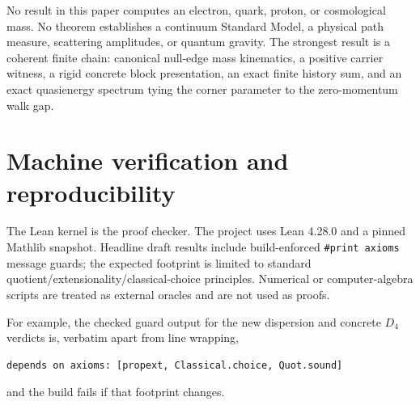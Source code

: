 \documentclass[11pt]{article}
\begin{document}
No result in this paper computes an electron, quark, proton, or cosmological
mass.  No theorem establishes a continuum Standard Model, a physical path
measure, scattering amplitudes, or quantum gravity.  The strongest result is a
coherent finite chain: canonical null-edge mass kinematics, a positive carrier
witness, a rigid concrete block presentation, an exact finite history sum, and
an exact quasienergy spectrum tying the corner parameter to the zero-momentum
walk gap.

\section{Machine verification and reproducibility}

The Lean kernel is the proof checker.  The project uses Lean 4.28.0 and a pinned
Mathlib snapshot.  Headline draft results include build-enforced
\texttt{\#print axioms} message guards; the expected footprint is limited to
standard quotient/extensionality/classical-choice principles.  Numerical or
computer-algebra scripts are treated as external oracles and are not used as
proofs.

For example, the checked guard output for the new dispersion and concrete
$D_4$ verdicts is, verbatim apart from line wrapping,
\begin{verbatim}
depends on axioms: [propext, Classical.choice, Quot.sound]
\end{verbatim}
and the build fails if that footprint changes.
\end{document}
